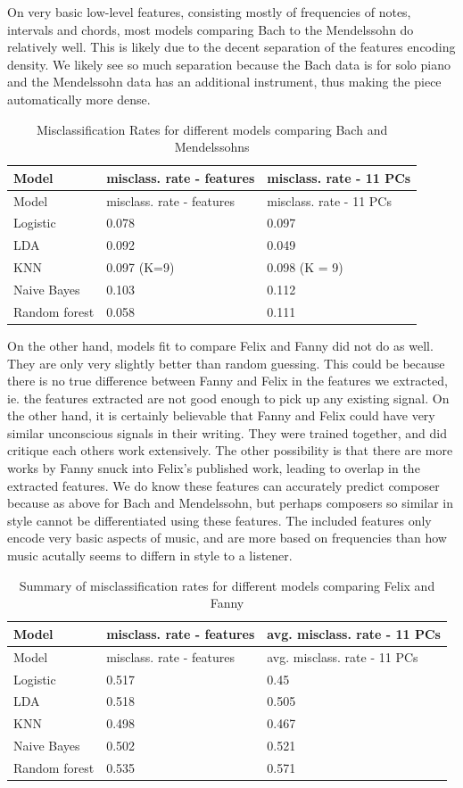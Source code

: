 \documentclass[12pt,twoside]{reedthesis}
\theoremstyle{definition}
\theoremstyle{definition}
\theoremstyle{definition}
\theoremstyle{remark}
\begin{document}
On very basic low-level features, consisting mostly of frequencies of
notes, intervals and chords, most models comparing Bach to the
Mendelssohn do relatively well. This is likely due to the decent
separation of the features encoding density. We likely see so much
separation because the Bach data is for solo piano and the Mendelssohn
data has an additional instrument, thus making the piece automatically
more dense.
\begin{longtable}[]{@{}lll@{}}
\caption{Misclassification Rates for different models comparing Bach and
Mendelssohns}\tabularnewline
\toprule
Model & misclass. rate - features & misclass. rate - 11
PCs\tabularnewline
\midrule
\endfirsthead
\toprule
Model & misclass. rate - features & misclass. rate - 11
PCs\tabularnewline
\midrule
\endhead
Logistic & 0.078 & 0.097\tabularnewline
LDA & 0.092 & 0.049\tabularnewline
KNN & 0.097 (K=9) & 0.098 (K = 9)\tabularnewline
Naive Bayes & 0.103 & 0.112\tabularnewline
Random forest & 0.058 & 0.111\tabularnewline
\bottomrule
\end{longtable}
On the other hand, models fit to compare Felix and Fanny did not do as
well. They are only very slightly better than random guessing. This
could be because there is no true difference between Fanny and Felix in
the features we extracted, ie. the features extracted are not good
enough to pick up any existing signal. On the other hand, it is
certainly believable that Fanny and Felix could have very similar
unconscious signals in their writing. They were trained together, and
did critique each others work extensively. The other possibility is that
there are more works by Fanny snuck into Felix's published work, leading
to overlap in the extracted features. We do know these features can
accurately predict composer because as above for Bach and Mendelssohn,
but perhaps composers so similar in style cannot be differentiated using
these features. The included features only encode very basic aspects of
music, and are more based on frequencies than how music acutally seems
to differn in style to a listener.
\begin{longtable}[]{@{}lll@{}}
\caption{Summary of misclassification rates for different models
comparing Felix and Fanny}\tabularnewline
\toprule
Model & misclass. rate - features & avg. misclass. rate - 11
PCs\tabularnewline
\midrule
\endfirsthead
\toprule
Model & misclass. rate - features & avg. misclass. rate - 11
PCs\tabularnewline
\midrule
\endhead
Logistic & 0.517 & 0.45\tabularnewline
LDA & 0.518 & 0.505\tabularnewline
KNN & 0.498 & 0.467\tabularnewline
Naive Bayes & 0.502 & 0.521\tabularnewline
Random forest & 0.535 & 0.571\tabularnewline
\bottomrule
\end{longtable}
\end{document}
